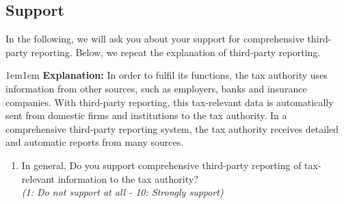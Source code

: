 \documentclass[11pt]{article}
\begin{document}
\subsection*{Support}
 \noindent In the following, we will ask you about your support for comprehensive third-party reporting. Below, we repeat the explanation of third-party reporting.\\

\begin{adjustwidth}{1em}{1em}  \textbf{Explanation:} In order to fulfil its functions, the tax authority uses information from other sources, such as employers, banks and insurance companies. With third-party reporting, this tax-relevant data is automatically sent from domestic firms and institutions to the tax authority. In a comprehensive third-party reporting system, the tax authority receives detailed and automatic reports from many sources.
\end{adjustwidth}
\begin{enumerate}[resume]
    \item In general, Do you support comprehensive third-party reporting of tax-relevant information to the tax authority?  \\ \textit{(1: Do not support at all - 10: Strongly support)}
\end{enumerate}
\end{document}
